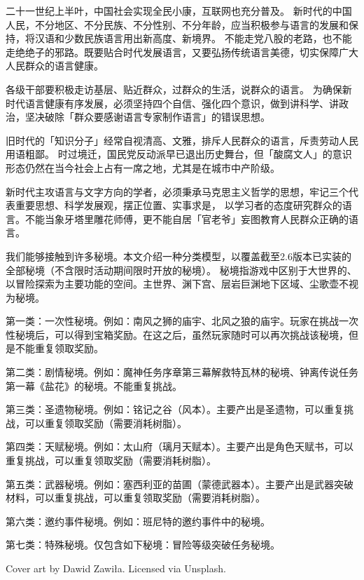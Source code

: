 二十一世纪上半叶，中国社会实现全民小康，互联网也充分普及。%
新时代的中国人民，不分地区、不分民族、不分性别、不分年龄，应当积极参与语言的发展和保持，将汉语和少数民族语言用出新高度、新境界。%
不能走党八股的老路，也不能走绝绝子的邪路。既要贴合时代发展语言，又要弘扬传统语言美德，切实保障广大人民群众的语言健康。

各级干部要积极走访基层、贴近群众，过群众的生活，说群众的语言。%
为确保新时代语言健康有序发展，必须坚持四个自信、强化四个意识，做到讲科学、讲政治，坚决破除「群众要感谢语言专家制作语言」的错误思想。

旧时代的「知识分子」经常自视清高、文雅，排斥人民群众的语言，斥责劳动人民用语粗鄙。%
时过境迁，国民党反动派早已退出历史舞台，但「酸腐文人」的意识形态仍然在当今社会上占有一席之地，尤其是在城市中产阶级。

新时代主攻语言与文字方向的学者，必须秉承马克思主义哲学的思想，牢记三个代表重要思想、科学发展观，摆正位置、实事求是，%
以学习者的态度研究群众的语言。不能当象牙塔里雕花师傅，更不能自居「官老爷」妄图教育人民群众正确的语言。








我们能够接触到许多秘境。本文介绍一种分类模型，以覆盖截至2.6版本已实装的全部秘境（不含限时活动期间限时开放的秘境）。
秘境指游戏中区别于大世界的、以冒险探索为主要功能的空间。主世界、渊下宫、层岩巨渊地下区域、尘歌壶不视为秘境。

第一类：一次性秘境。例如：南风之狮的庙宇、北风之狼的庙宇。玩家在挑战一次性秘境后，可以得到宝箱奖励。在这之后，虽然玩家随时可以再次挑战该秘境，但是不能重复领取奖励。

第二类：剧情秘境。例如：魔神任务序章第三幕解救特瓦林的秘境、钟离传说任务第一幕《盐花》的秘境。不能重复挑战。

第三类：圣遗物秘境。例如：铭记之谷（风本）。主要产出是圣遗物，可以重复挑战，可以重复领取奖励（需要消耗树脂）。

第四类：天赋秘境。例如：太山府（璃月天赋本）。主要产出是角色天赋书，可以重复挑战，可以重复领取奖励（需要消耗树脂）。

第五类：武器秘境。例如：塞西利亚的苗圃（蒙德武器本）。主要产出是武器突破材料，可以重复挑战，可以重复领取奖励（需要消耗树脂）。

第六类：邀约事件秘境。例如：班尼特的邀约事件中的秘境。

第七类：特殊秘境。仅包含如下秘境：冒险等级突破任务秘境。








\noindent
Cover art by Dawid Zawiła. Licensed via Unsplash.




